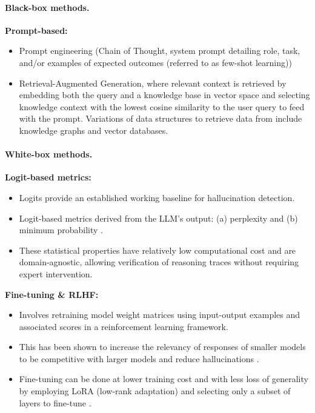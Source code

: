 \paragraph{Black-box methods.}
\textbf{Prompt-based:}
\begin{itemize}
    \item Prompt engineering (Chain of Thought, system prompt detailing role, task, and/or examples of expected outcomes (referred to as few-shot learning))
    \item Retrieval-Augmented Generation, where relevant context is retrieved by embedding both the query and a knowledge base in vector space and selecting knowledge context with the lowest cosine similarity to the user query to feed with the prompt. Variations of data structures to retrieve data from include knowledge graphs and vector databases.
\end{itemize}

\paragraph{White-box methods.}
\textbf{Logit-based metrics:}
\begin{itemize}
    \item Logits provide an established working baseline for hallucination detection.
    \item Logit-based metrics derived from the LLM's output: (a) perplexity and (b) minimum probability \citep{varshney2023stitch}.
    \item These statistical properties have relatively low computational cost and are domain-agnostic, allowing verification of reasoning traces without requiring expert intervention.
\end{itemize}

\textbf{Fine-tuning \& RLHF:}
\begin{itemize}
    \item Involves retraining model weight matrices using input-output examples and associated scores in a reinforcement learning framework.
    \item This has been shown to increase the relevancy of responses of smaller models to be competitive with larger models and reduce hallucinations \citep{ouyang2022rlhf}.
    \item Fine-tuning can be done at lower training cost and with less loss of generality by employing LoRA (low-rank adaptation) and selecting only a subset of layers to fine-tune \citep{hu2021lora}.
\end{itemize}

